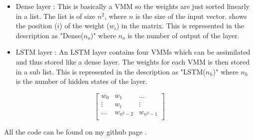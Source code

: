 \begin{itemize}
  \item Dense layer : This is basically a \ac{VMM} so the weights are just sorted linearly in a list. The list is of size $n^2$, where $n$ is the size of the input vector.  shows the position ($i$) of the weight ($w_i$) in the matrix. This is represented in the description as "Dense($n_o$)" where $n_o$ is the number of output of the layer.
  \item \ac{LSTM} layer : An \ac{LSTM} layer contains four \acp{VMM} which can be assimilated and thus stored like a dense layer. The weights for each \ac{VMM} is then stored in a sub list. This is represented in the description as "LSTM($n_h$)" where $n_h$ is the number of hidden states of the layer.
\end{itemize}

\begin{equation}\label{mtrx:wei}
  \begin{bmatrix}
    w_{0} & w_{1} & \dots \\
    \vdots & w_i & \vdots \\
    \dots & w_{n^2-2} & w_{n^2-1}\\
  \end{bmatrix}
\end{equation}

All the code can be found on my github page \cite{lstmGen}.
